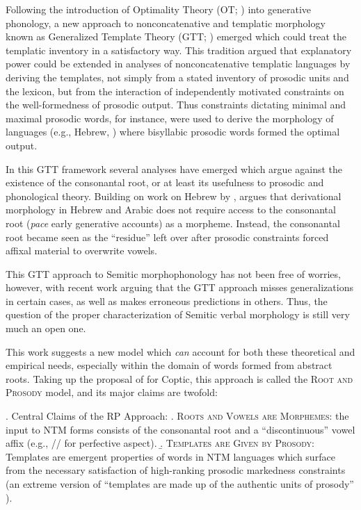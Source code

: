 \documentclass[12pt,twoside,letterpaper]{article}
\begin{document}
Following the introduction of Optimality Theory (OT; \cite{prince04}) into generative phonology, a new approach to nonconcatenative and templatic morphology known as Generalized Template Theory (GTT; \cite{mccarthy94}) emerged which could treat the templatic inventory in a satisfactory way. This tradition argued that explanatory power could be extended in analyses of nonconcatenative templatic languages by deriving the templates, not simply from a stated inventory of prosodic units and the lexicon, but from the interaction of independently motivated constraints on the well-formedness of prosodic output. Thus constraints dictating minimal and maximal prosodic words, for instance, were used to derive the morphology of languages (e.g., Hebrew, \cite{ussishkin00, ussishkin05}) where bisyllabic prosodic words formed the optimal output.

In this GTT framework several analyses have emerged which argue against the existence of the consonantal root, or at least its usefulness to prosodic and phonological theory. Building on work on Hebrew by \cite{batel94, batel03}, \cite{ussishkin99,ussishkin00,ussishkin05} argues that derivational morphology in Hebrew and Arabic does not require access to the consonantal root (\emph{pace} early generative accounts) as a morpheme. Instead, the consonantal root became seen as the ``residue'' left over after prosodic constraints forced affixal material to overwrite vowels.

This GTT approach to Semitic morphophonology has not been free of worries, however, with recent work \citep{arad03,nevins05,arad05} arguing that the GTT approach misses generalizations in certain cases, as well as makes erroneous predictions in others. Thus, the question of the proper characterization of Semitic verbal morphology is still very much an open one.

This work suggests a new model which \emph{can} account for both these theoretical and empirical needs, especially within the domain of words formed from abstract roots. Taking up the proposal of \cite{kramer07} for Coptic, this approach is called the \textsc{Root and Prosody} model, and its major claims are twofold:

\ex. Central Claims of the RP Approach:
\a. \textsc{Roots and Vowels are Morphemes}: the input to NTM forms consists of the consonantal root and a ``discontinuous'' vowel affix (e.g., // for perfective aspect).
\b. \textsc{Templates are Given by Prosody}: Templates are emergent properties of words in NTM languages which surface from the necessary satisfaction of high-ranking prosodic markedness constraints (an extreme version of ``templates are made up of the authentic units of prosody'' \citep{mccarthy86}).
\end{document}
